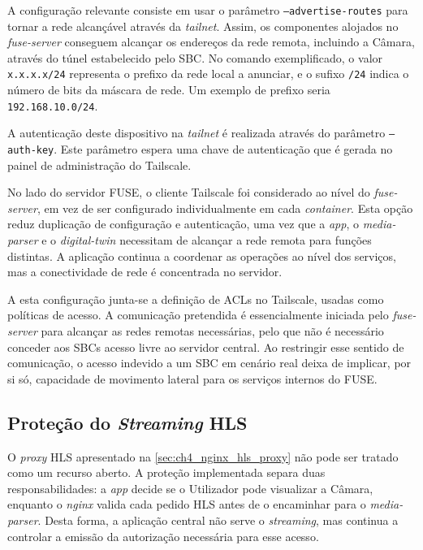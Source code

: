 A configuração relevante consiste em usar o parâmetro \texttt{--advertise-routes} para tornar a rede alcançável através da \textit{tailnet}. Assim, os componentes alojados no \textit{fuse-server} conseguem alcançar os endereços da rede remota, incluindo a Câmara, através do túnel estabelecido pelo \gls{SBC}. No comando exemplificado, o valor \texttt{x.x.x.x/24} representa o prefixo da rede local a anunciar, e o sufixo \texttt{/24} indica o número de bits da máscara de rede. Um exemplo de prefixo seria \texttt{192.168.10.0/24}.

A autenticação deste dispositivo na \textit{tailnet} é realizada através do parâmetro \texttt{--auth-key}. Este parâmetro espera uma chave de autenticação que é gerada no painel de administração do Tailscale.

No lado do servidor \gls{FUSE}, o cliente Tailscale foi considerado ao nível do \textit{fuse-server}, em vez de ser configurado individualmente em cada \textit{container}. Esta opção reduz duplicação de configuração e autenticação, uma vez que a \textit{app}, o \textit{media-parser} e o \textit{digital-twin} necessitam de alcançar a rede remota para funções distintas. A aplicação continua a coordenar as operações ao nível dos serviços, mas a conectividade de rede é concentrada no servidor.

A esta configuração junta-se a definição de \glspl{ACL} no Tailscale, usadas como políticas de acesso. A comunicação pretendida é essencialmente iniciada pelo \textit{fuse-server} para alcançar as redes remotas necessárias, pelo que não é necessário conceder aos \glspl{SBC} acesso livre ao servidor central. Ao restringir esse sentido de comunicação, o acesso indevido a um \gls{SBC} em cenário real deixa de implicar, por si só, capacidade de movimento lateral para os serviços internos do \gls{FUSE}.

\subsection{Proteção do \textit{Streaming} \gls{HLS}}

O \textit{proxy} \gls{HLS} apresentado na \autoref{sec:ch4_nginx_hls_proxy} não pode ser tratado como um recurso aberto. A proteção implementada separa duas responsabilidades: a \textit{app} decide se o Utilizador pode visualizar a Câmara, enquanto o \textit{nginx} valida cada pedido \gls{HLS} antes de o encaminhar para o \textit{media-parser}. Desta forma, a aplicação central não serve o \textit{streaming}, mas continua a controlar a emissão da autorização necessária para esse acesso.

